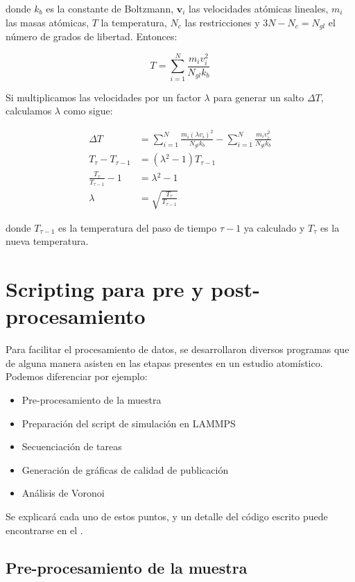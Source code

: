 donde $k_{b}$ es la constante de Boltzmann, $\mathbf{v}_{i}$ las velocidades atómicas lineales, $m_{i}$ las masas atómicas, $T$ la temperatura, $N_{c}$ las restricciones y $3N-N_{c} = N_{gl}$ el número de grados de libertad. Entonces:

\begin{equation}
T = \sum_{i=1}^{N}\frac{m_{i}v_{i}^{2}}{N_{gl}k_{b}}
\end{equation}

Si multiplicamos las velocidades por un factor $\lambda$ para generar un salto $\Delta{}T$, calculamos $\lambda$ como sigue:

\begin{align}
\Delta{}T &= \sum_{i=1}^{N}\frac{m_{i}(\lambda{}v_{i})^{2}}{N_{gl}k_{b}} - \sum_{i=1}^{N}\frac{m_{i}v_{i}^{2}}{N_{gl}k_{b}}\\
T_{\tau} - T_{\tau{}-1} &= (\lambda{}^{2}-1)T_{\tau{}-1}\\
\frac{T_{\tau}}{T_{\tau{}-1}} - 1 &= \lambda{}^{2}-1 \\
\lambda{} &= \sqrt{\frac{T_{\tau{}}}{T_{\tau{}-1}}}
\end{align}

donde $T_{\tau{}-1}$ es la temperatura del paso de tiempo $\tau{}-1$ ya calculado y $T_{\tau}$ es la nueva temperatura.

\section{Scripting para pre y post-procesamiento}

Para facilitar el procesamiento de datos, se desarrollaron diversos programas que de alguna manera asisten en las etapas presentes en un estudio atomístico. Podemos diferenciar por ejemplo:

\begin{itemize}
 \item Pre-procesamiento de la muestra
 \item Preparación del script de simulación en LAMMPS
 \item Secuenciación de tareas
 \item Generación de gráficas de calidad de publicación
 \item Análisis de Voronoi
\end{itemize}

Se explicará cada uno de estos puntos, y un detalle del código escrito puede encontrarse en el .

\subsection{Pre-procesamiento de la muestra}

